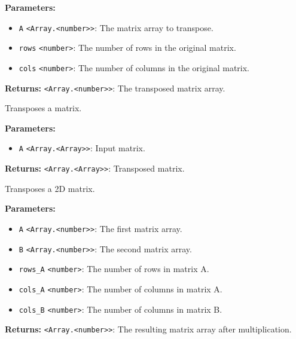 \documentclass[12pt,a4paper]{article}
\begin{document}
\noindent \textbf{Parameters:}
\begin{itemize}
  \item \texttt{A} \texttt{<Array.<number>>}: The matrix array to transpose.
  \item \texttt{rows} \texttt{<number>}: The number of rows in the original matrix.
  \item \texttt{cols} \texttt{<number>}: The number of columns in the original matrix.
\end{itemize}

\noindent \textbf{Returns:} \texttt{<Array.<number>>}: The transposed matrix array.

\noindent Transposes a matrix.

\vspace{5mm}
\noindent {}


\noindent \textbf{Parameters:}
\begin{itemize}
  \item \texttt{A} \texttt{<Array.<Array>>}: Input matrix.
\end{itemize}

\noindent \textbf{Returns:} \texttt{<Array.<Array>>}: Transposed matrix.

\noindent Transposes a 2D matrix.

\vspace{5mm}
\noindent {}


\noindent \textbf{Parameters:}
\begin{itemize}
  \item \texttt{A} \texttt{<Array.<number>>}: The first matrix array.
  \item \texttt{B} \texttt{<Array.<number>>}: The second matrix array.
  \item \texttt{rows\_A} \texttt{<number>}: The number of rows in matrix A.
  \item \texttt{cols\_A} \texttt{<number>}: The number of columns in matrix A.
  \item \texttt{cols\_B} \texttt{<number>}: The number of columns in matrix B.
\end{itemize}

\noindent \textbf{Returns:} \texttt{<Array.<number>>}: The resulting matrix array after multiplication.
\end{document}
